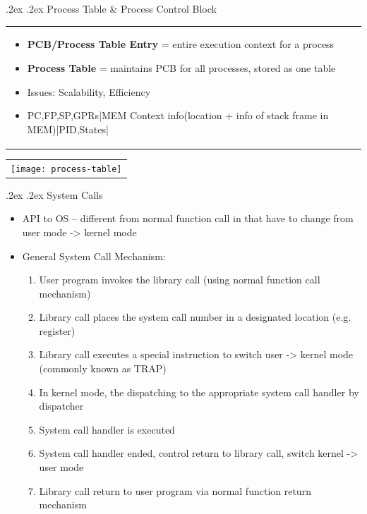 \documentclass[10pt,landscape,a4paper]{article}
\makeatletter
\renewcommand{\subsection}{\@startsection{subsection}{1}{0mm}%
  {.2ex}%
  {.2ex}%
{\sffamily\bfseries}}
\makeatother
\begin{document}
\begin{multicols*}{4}
  \subsection{Process Table \& Process Control Block}
  \begin{tabularx}{0.42\columnwidth}{X}
    \begin{itemize}
      \item \textbf{PCB/Process Table Entry} = entire execution context for a process
      \item \textbf{Process Table} =  maintains PCB for all processes, stored as one table
      \item Issues: Scalability, Efficiency
      \item PC,FP,SP,GPRs|MEM Context info(location + info of stack frame in MEM)|PID,States|
    \end{itemize}
    
  \end{tabularx}
  \begin{tabular}{l}
    \texttt{[image: process-table]}
  \end{tabular}
  \subsection{System Calls}
  \begin{itemize}
    \item API to OS -- different from normal function call in that have to change from user mode -> kernel mode
    \item General System Call Mechanism:
    \begin{enumerate}
      \item User program invokes the library call (using normal function call mechanism)
      \item Library call places the system call number in a designated location (e.g. register)
      \item Library call executes a special instruction to switch user -> kernel mode (commonly known as TRAP)
      \item In kernel mode, the dispatching to the appropriate system call handler by dispatcher
      \item System call handler is executed
      \item System call handler ended, control return to library call, switch kernel -> user mode
      \item Library call return to user program via normal function return mechanism
    \end{enumerate}
  \end{itemize}

\end{multicols*}
\end{document}

